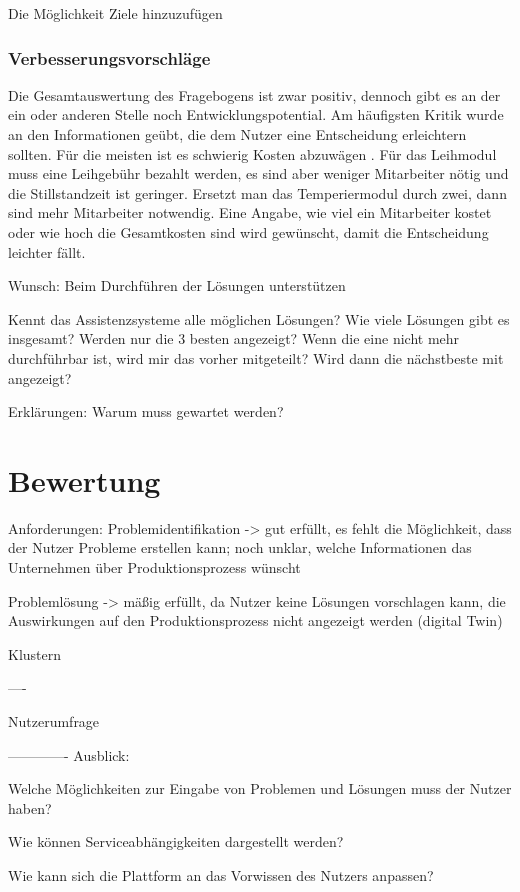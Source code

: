 Die Möglichkeit Ziele hinzuzufügen

\subsubsection*{Verbesserungsvorschläge}
Die Gesamtauswertung des Fragebogens ist zwar positiv, dennoch gibt es an der ein oder anderen Stelle noch Entwicklungspotential. Am häufigsten Kritik wurde an den Informationen geübt, die dem Nutzer eine Entscheidung erleichtern sollten. Für die meisten ist es schwierig Kosten abzuwägen . Für das Leihmodul muss eine Leihgebühr bezahlt werden, es sind aber weniger Mitarbeiter nötig und die Stillstandzeit ist geringer. Ersetzt man das Temperiermodul durch zwei, dann sind mehr Mitarbeiter notwendig. Eine Angabe, wie viel ein Mitarbeiter kostet oder wie hoch die Gesamtkosten sind wird gewünscht, damit die Entscheidung leichter fällt. 



Wunsch: Beim Durchführen der Lösungen unterstützen

Kennt das Assistenzsysteme alle möglichen Lösungen? Wie viele Lösungen gibt es insgesamt? Werden nur die 3 besten angezeigt? Wenn die eine nicht mehr durchführbar ist, wird mir das vorher mitgeteilt? Wird dann die nächstbeste mit angezeigt?

Erklärungen: Warum muss gewartet werden?


\section{Bewertung}
Anforderungen:
Problemidentifikation -> gut erfüllt, es fehlt die Möglichkeit, dass der Nutzer Probleme erstellen kann; noch unklar, welche Informationen das Unternehmen über Produktionsprozess wünscht

Problemlösung -> mäßig erfüllt, da Nutzer keine Lösungen vorschlagen kann, die Auswirkungen auf den Produktionsprozess nicht angezeigt werden (digital Twin)

Klustern

----

Nutzerumfrage

-------------
Ausblick:

Welche Möglichkeiten zur Eingabe von Problemen und Lösungen muss der Nutzer haben?

Wie können Serviceabhängigkeiten dargestellt werden?

Wie kann sich die Plattform an das Vorwissen des Nutzers anpassen?